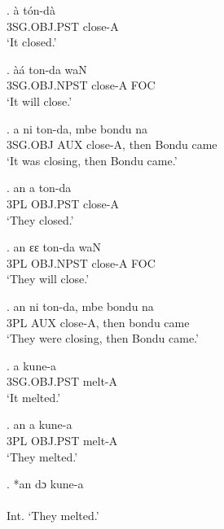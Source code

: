 \documentclass{assets/fieldnotes}
\begin{document}
\exg.
à             tón-dà  \\
3SG.OBJ.PST   close-A \\%
`It closed.'

\exg.
àá             ton-da    waN \\
3SG.OBJ.NPST   close-A   FOC \\%
`It will close.'

\exg.
a         ni    ton-da,    mbe    bondu   na   \\
3SG.OBJ   AUX   close-A,   then   Bondu   came \\%
`It was closing, then Bondu came.'

\exg.
an    a         ton-da  \\
3PL   OBJ.PST   close-A \\%
`They closed.'

\exg.
an    ɛɛ         ton-da    waN \\
3PL   OBJ.NPST   close-A   FOC \\%
`They will close.' \label{26890}


\exg.
an    ni    ton-da,    mbe    bondu   na   \\
3PL   AUX   close-A,   then   bondu   came \\%
`They were closing, then Bondu came.' \label{17800}


\exg.
a             kune-a \\
3SG.OBJ.PST   melt-A \\%
`It melted.'

\exg.
an    a         kune-a \\
3PL   OBJ.PST   melt-A \\%
`They melted.'

\exg.
*an   dɔ   kune-a \\
{}    {}   {}     \\%
Int. `They melted.' \label{42408}

\end{document}
